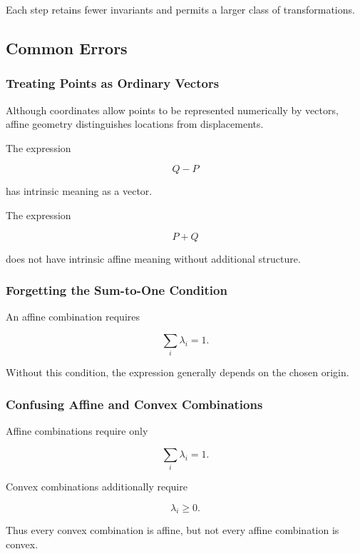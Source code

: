 Each step retains fewer invariants and permits a larger class of
transformations.

\subsection{Common Errors}
\label{subsec:affine-geometry-common-errors}

\subsubsection{Treating Points as Ordinary Vectors}

Although coordinates allow points to be represented numerically by vectors,
affine geometry distinguishes locations from displacements.

The expression

\[ Q-P \]

has intrinsic meaning as a vector.

The expression

\[ P+Q \]

does not have intrinsic affine meaning without additional structure.

\subsubsection{Forgetting the Sum-to-One Condition}

An affine combination requires

\[ \boxed{\sum_i\lambda_i=1.} \]

Without this condition, the expression generally depends on the chosen
origin.

\subsubsection{Confusing Affine and Convex Combinations}

Affine combinations require only

\[ \sum_i\lambda_i=1. \]

Convex combinations additionally require

\[ \lambda_i\geq0. \]

Thus every convex combination is affine, but not every affine combination is
convex.

